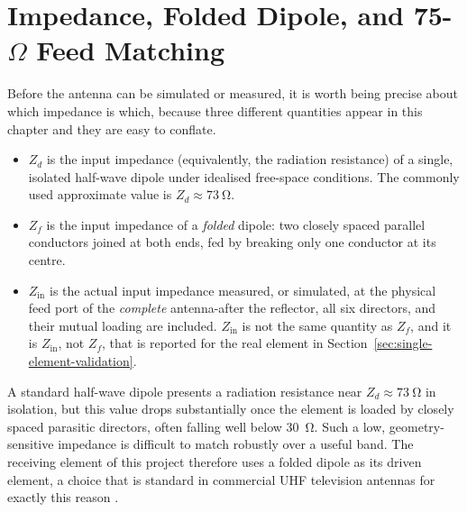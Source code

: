 \section{Impedance, Folded Dipole, and 75-\texorpdfstring{$\Omega$}{Ohm} Feed Matching}
\label{sec:matching}

Before the antenna can be simulated or measured, it is worth being precise
about which impedance is which, because three different quantities appear in
this chapter and they are easy to conflate.
\begin{itemize}[leftmargin=1.5em,itemsep=1pt,topsep=2pt]
  \item $Z_d$ is the input impedance (equivalently, the radiation resistance)
        of a single, isolated half-wave dipole under idealised free-space
        conditions. The commonly used approximate value is
        $Z_d\approx\SI{73}{\ohm}$.
  \item $Z_f$ is the input impedance of a \emph{folded} dipole: two closely
        spaced parallel conductors joined at both ends, fed by breaking only
        one conductor at its centre.
  \item $Z_\mathrm{in}$ is the actual input impedance measured, or simulated,
        at the physical feed port of the \emph{complete} antenna-after the
        reflector, all six directors, and their mutual loading are included.
        $Z_\mathrm{in}$ is not the same quantity as $Z_f$, and it is
        $Z_\mathrm{in}$, not $Z_f$, that is reported for the real element in
        Section~\ref{sec:single-element-validation}.
\end{itemize}

A standard half-wave dipole presents a radiation resistance near $Z_d\approx
\SI{73}{\ohm}$ in isolation, but this value drops substantially once the
element is loaded by closely spaced parasitic directors, often falling well
below \SI{30}{\ohm}. Such a low, geometry-sensitive impedance is difficult to
match robustly over a useful band. The receiving element of this project
therefore uses a folded dipole as its driven element, a choice that is
standard in commercial UHF television antennas for exactly this reason
\citep{kraus1988}.


